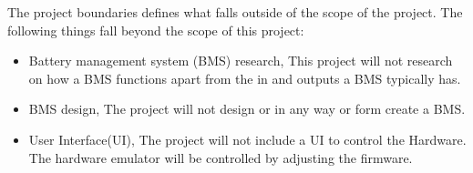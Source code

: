 The project boundaries defines what falls outside of the scope of the project.
The following things fall beyond the scope of this project:
\begin{itemize}
    \item Battery management system (BMS) research, This project will not research on how a BMS functions apart from the in and outputs a BMS typically has.
    \item BMS design, The project will not design or in any way or form create a BMS.
    \item User Interface(UI), The project will not include a UI to control the Hardware. The hardware emulator will be controlled by adjusting the firmware.
\end{itemize}